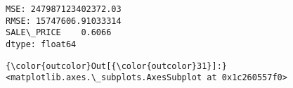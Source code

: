 \documentclass[11pt]{article}
\begin{document}
    \begin{Verbatim}[commandchars=\\\{\}]
MSE: 247987123402372.03
RMSE: 15747606.91033314
SALE\_PRICE    0.6066
dtype: float64

    \end{Verbatim}

\begin{Verbatim}[commandchars=\\\{\}]
{\color{outcolor}Out[{\color{outcolor}31}]:} <matplotlib.axes.\_subplots.AxesSubplot at 0x1c260557f0>
\end{Verbatim}
            
    \begin{center}
    \end{center}
    { \hspace*{\fill} \\}
    
\end{document}
